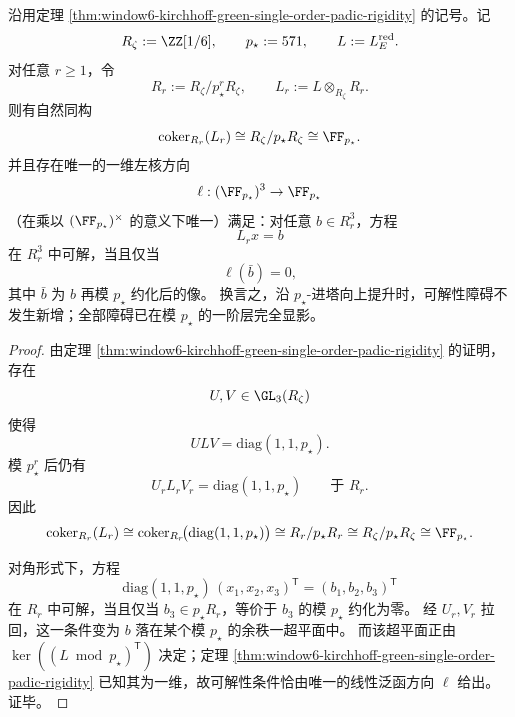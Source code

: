 \begin{theorem}\label{thm:window6-kirchhoff-green-padic-lift-stability}
沿用定理 \ref{thm:window6-kirchhoff-green-single-order-padic-rigidity} 的记号。记
\[
R_\zeta:=\ZZ[1/6],\qquad
p_\star:=571,\qquad
L:=L_E^{\mathrm{red}}.
\]
对任意 \(r\ge 1\)，令
\[
R_r:=R_\zeta/p_\star^rR_\zeta,
\qquad
L_r:=L\otimes_{R_\zeta}R_r.
\]
则有自然同构
\[
\mathrm{coker}_{R_r}(L_r)\cong R_\zeta/p_\star R_\zeta\cong \FF_{p_\star}.
\]
并且存在唯一的一维左核方向
\[
\ell:(\FF_{p_\star})^3\to \FF_{p_\star}
\]
（在乘以 \((\FF_{p_\star})^\times\) 的意义下唯一）满足：对任意 \(b\in R_r^3\)，方程
\[
L_r x=b
\]
在 \(R_r^3\) 中可解，当且仅当
\[
\ell(\bar b)=0,
\]
其中 \(\bar b\) 为 \(b\) 再模 \(p_\star\) 约化后的像。
换言之，沿 \(p_\star\)-进塔向上提升时，可解性障碍不发生新增；全部障碍已在模 \(p_\star\) 的一阶层完全显影。
\end{theorem}
\begin{proof}
由定理 \ref{thm:window6-kirchhoff-green-single-order-padic-rigidity} 的证明，存在
\[
U,V\in \GL_3(R_\zeta)
\]
使得
\[
ULV=\mathrm{diag}(1,1,p_\star).
\]
模 \(p_\star^r\) 后仍有
\[
U_rL_rV_r=\mathrm{diag}(1,1,p_\star)
\qquad\text{于 }R_r.
\]
因此
\[
\mathrm{coker}_{R_r}(L_r)
\cong
\mathrm{coker}_{R_r}\!\bigl(\mathrm{diag}(1,1,p_\star)\bigr)
\cong
R_r/p_\star R_r
\cong
R_\zeta/p_\star R_\zeta
\cong
\FF_{p_\star}.
\]
\par
对角形式下，方程
\[
\mathrm{diag}(1,1,p_\star)\,(x_1,x_2,x_3)^{\mathsf T}
=(b_1,b_2,b_3)^{\mathsf T}
\]
在 \(R_r\) 中可解，当且仅当 \(b_3\in p_\star R_r\)，等价于 \(b_3\) 的模 \(p_\star\) 约化为零。
经 \(U_r,V_r\) 拉回，这一条件变为 \(b\) 落在某个模 \(p_\star\) 的余秩一超平面中。
而该超平面正由
\(
\ker((L\bmod p_\star)^{\mathsf T})
\)
决定；定理 \ref{thm:window6-kirchhoff-green-single-order-padic-rigidity} 已知其为一维，故可解性条件恰由唯一的线性泛函方向 \(\ell\) 给出。证毕。
\end{proof}

